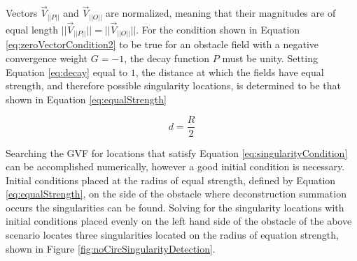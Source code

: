 \documentclass[numbered,pdftex]{ohio-etd}
\begin{document}
Vectors $\overrightarrow{V}_{||P||}$ and $\overrightarrow{V}_{||O||}$ are normalized, meaning that their magnitudes are of equal length $||\overrightarrow{V}_{||P||}||=||\overrightarrow{V}_{||O||}||$. For the condition shown in Equation \ref{eq:zeroVectorCondition2} to be true for an obstacle field with a negative convergence weight $G=-1$, the decay function $P$ must be unity. Setting Equation \ref{eq:decay} equal to $1$, the distance at which the fields have equal strength, and therefore possible singularity locations, is determined to be that shown in Equation \ref{eq:equalStrength}

\begin{equation}
\label{eq:equalStrength}
d = \frac{R}{2}
\end{equation}

Searching the GVF for locations that satisfy Equation \ref{eq:singularityCondition} can be accomplished numerically, however a good initial condition is necessary. Initial conditions placed at the radius of equal strength, defined by Equation \ref{eq:equalStrength}, on the side of the obstacle where deconstruction summation occurs the singularities can be found. Solving for the singularity locations with initial conditions placed evenly on the left hand side of the obstacle of the above scenario locates three singularities located on the radius of equation strength, shown in Figure \ref{fig:noCircSingularityDetection}.
\end{document}
